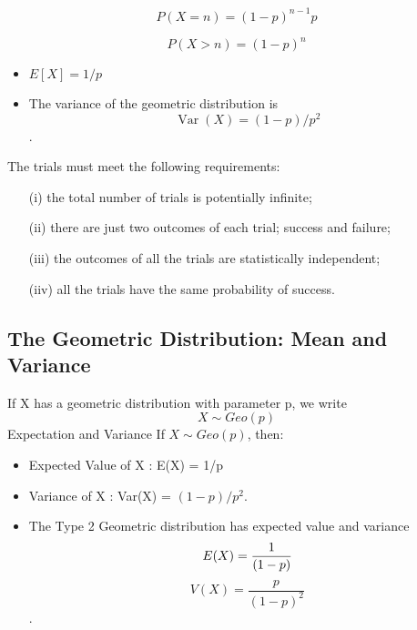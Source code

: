 \documentclass[]{report}
\begin{document}
\[ P(X = n) = (1-p)^{n-1}p \]

\[ P(X > n) = (1-p)^n \]



\begin{itemize}
	\item $ E[X] = 1/p $
	
	\item The variance of the geometric distribution is 
	\[\operatorname{Var}(X) = (1-p)/p^2\].
	
\end{itemize}



The trials must meet the following requirements:

\begin{itemize}
	\item[(i)] the total number of trials is potentially infinite;
	\item[(ii)] there are just two outcomes of each trial; success and failure;
	\item[(iii)] the outcomes of all the trials are statistically independent;
	\item[(iiv)] all the trials have the same probability of success.
\end{itemize}




\subsection{The Geometric Distribution: Mean and Variance}

If X has a geometric distribution with parameter p, we write
\[X \sim Geo(p) \]
Expectation and Variance
If $X \sim Geo(p)$, then:

\begin{itemize}
	\item Expected Value of X : E(X) = 1/p
	\item Variance of X : Var(X) = $(1-p)/p^2$.
\end{itemize}



\begin{itemize}
	\item The Type 2 Geometric distribution has expected value and variance  \[E(X)= {1\over(1-p)}\] \[V(X)=\frac{p}{{(1-p)^2}}\].
	
\end{itemize}
\end{document}

